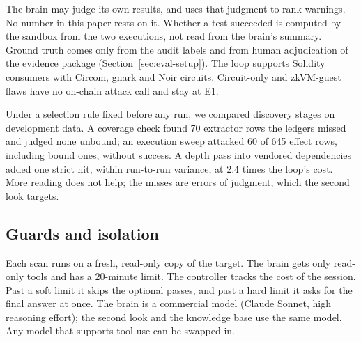 The brain may judge its own results, and \tool{} uses that judgment to rank
warnings. No number in this paper rests on it. Whether a test succeeded is
computed by the sandbox from the two executions, not read from the brain's
summary. Ground truth comes only from the audit labels and from human
adjudication of the evidence package (Section~\ref{sec:eval-setup}). The loop
supports Solidity consumers with Circom, gnark and Noir circuits.
Circuit-only and zkVM-guest flaws have no on-chain attack call and stay at E1.

Under a selection rule fixed before any run, we compared discovery stages on
development data. A coverage check found 70 extractor rows the ledgers missed
and judged none unbound; an execution sweep attacked 60 of 645 effect rows,
including bound ones, without success.
A depth pass into vendored dependencies added one strict hit, within
run-to-run variance, at 2.4 times the loop's cost. More reading does not help;
the misses are errors of judgment, which the second look targets.

\subsection{Guards and isolation}\label{sec:design-guards}

Each scan runs on a fresh, read-only copy of the target. The brain gets only
read-only tools and has a 20-minute limit. The controller tracks the cost
of the session. Past a soft limit it skips the optional passes, and past a
hard limit it asks for the final answer at once. The brain is a commercial
model (Claude Sonnet, high reasoning effort); the second look and the knowledge
base use the same model. Any model that supports tool use
can be swapped in.
